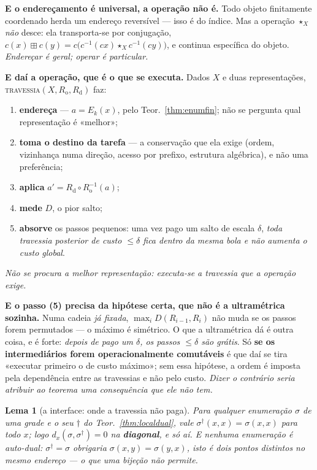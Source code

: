 \documentclass[11pt,a4paper]{article}
\newtheorem{lema}[teorema]{Lema}
\begin{document}
\medskip\noindent\textbf{E o endereçamento é universal, a operação não é.} Todo objeto
finitamente coordenado herda um endereço reversível --- isso é do índice. Mas a
operação $\star_X$ \emph{não} desce: ela transporta-se por conjugação,
$c(x)\boxplus c(y)=c\bigl(c^{-1}(cx)\star_X c^{-1}(cy)\bigr)$, e continua específica
do objeto. \emph{Endereçar é geral; operar é particular.}

\medskip\noindent\textbf{E daí a operação, que é o que se executa.} Dados $X$ e duas
representações, \textsc{travessia}$(X,R_{\text{o}},R_{\text{d}})$ faz:
\begin{enumerate}\itemsep2pt
\item[(1)] \textbf{endereça} --- $a=E_k(x)$, pelo Teor.~\ref{thm:enumfin}; não se
      pergunta qual representação é «melhor»;
\item[(2)] \textbf{toma o destino da tarefa} --- a conservação que ela exige (ordem,
      vizinhança numa direção, acesso por prefixo, estrutura algébrica), e não uma
      preferência;
\item[(3)] \textbf{aplica} $a'=R_{\text{d}}\circ R_{\text{o}}^{-1}(a)$;
\item[(4)] \textbf{mede} $D$, o pior salto;
\item[(5)] \textbf{absorve} os passos pequenos: uma vez pago um salto de escala
      $\delta$, \emph{toda travessia posterior de custo $\le\delta$ fica dentro da
      mesma bola e não aumenta o custo global}.
\end{enumerate}
\emph{Não se procura a melhor representação: executa-se a travessia que a operação
exige.}

\medskip\noindent\textbf{E o passo (5) precisa da hipótese certa, que não é a
ultramétrica sozinha.} Numa cadeia \emph{já fixada}, $\max_i D(R_{i-1},R_i)$ não muda
se os passos forem permutados --- o máximo é simétrico. O que a ultramétrica dá é
outra coisa, e é forte: \emph{depois de pago um $\delta$, os passos $\le\delta$ são
grátis}. Só \textbf{se os intermediários forem operacionalmente comutáveis} é que daí
se tira «executar primeiro o de custo máximo»; sem essa hipótese, a ordem é imposta
pela dependência entre as travessias e não pelo custo. \emph{Dizer o contrário seria
atribuir ao teorema uma consequência que ele não tem.}

\begin{lema}[a interface: onde a travessia não paga]\label{lem:interface}
Para qualquer enumeração $\sigma$ de uma grade e o seu $\dagger$ do
Teor.~\ref{thm:localdual}, vale $\sigma^{\dagger}(x,x)=\sigma(x,x)$ para todo $x$;
logo $d_x(\sigma,\sigma^{\dagger})=0$ na \textbf{diagonal}, e só aí. E nenhuma
enumeração é auto-dual: $\sigma^{\dagger}=\sigma$ obrigaria
$\sigma(x,y)=\sigma(y,x)$, isto é dois pontos distintos no mesmo endereço --- o que
uma bijeção não permite.
\end{lema}
\end{document}
